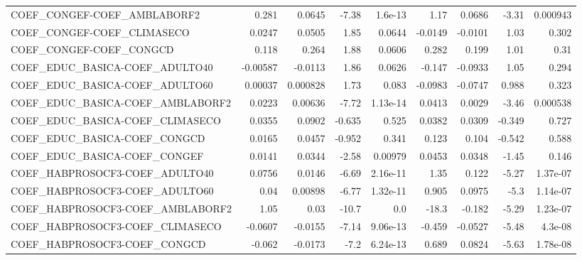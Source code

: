 \begin{tabular}{lrrrrrrrr}
COEF\_CONGEF-COEF\_AMBLABORF2            &       0.281 &       0.0645 &    -7.38 &  1.6e-13 &       1.17 &      0.0686 &        -3.31 &      0.000943 \\
COEF\_CONGEF-COEF\_CLIMASECO             &      0.0247 &       0.0505 &     1.85 &   0.0644 &    -0.0149 &     -0.0101 &         1.03 &         0.302 \\
COEF\_CONGEF-COEF\_CONGCD                &       0.118 &        0.264 &     1.88 &   0.0606 &      0.282 &       0.199 &         1.01 &          0.31 \\
COEF\_EDUC\_BASICA-COEF\_ADULTO40         &    -0.00587 &      -0.0113 &     1.86 &   0.0626 &     -0.147 &     -0.0933 &         1.05 &         0.294 \\
COEF\_EDUC\_BASICA-COEF\_ADULTO60         &     0.00037 &     0.000828 &     1.73 &    0.083 &    -0.0983 &     -0.0747 &        0.988 &         0.323 \\
COEF\_EDUC\_BASICA-COEF\_AMBLABORF2       &      0.0223 &      0.00636 &    -7.72 & 1.13e-14 &     0.0413 &      0.0029 &        -3.46 &      0.000538 \\
COEF\_EDUC\_BASICA-COEF\_CLIMASECO        &      0.0355 &       0.0902 &   -0.635 &    0.525 &     0.0382 &      0.0309 &       -0.349 &         0.727 \\
COEF\_EDUC\_BASICA-COEF\_CONGCD           &      0.0165 &       0.0457 &   -0.952 &    0.341 &      0.123 &       0.104 &       -0.542 &         0.588 \\
COEF\_EDUC\_BASICA-COEF\_CONGEF           &      0.0141 &       0.0344 &    -2.58 &  0.00979 &     0.0453 &      0.0348 &        -1.45 &         0.146 \\
COEF\_HABPROSOCF3-COEF\_ADULTO40         &      0.0756 &       0.0146 &    -6.69 & 2.16e-11 &       1.35 &       0.122 &        -5.27 &      1.37e-07 \\
COEF\_HABPROSOCF3-COEF\_ADULTO60         &        0.04 &      0.00898 &    -6.77 & 1.32e-11 &      0.905 &      0.0975 &         -5.3 &      1.14e-07 \\
COEF\_HABPROSOCF3-COEF\_AMBLABORF2       &        1.05 &         0.03 &    -10.7 &      0.0 &      -18.3 &      -0.182 &        -5.29 &      1.23e-07 \\
COEF\_HABPROSOCF3-COEF\_CLIMASECO        &     -0.0607 &      -0.0155 &    -7.14 & 9.06e-13 &     -0.459 &     -0.0527 &        -5.48 &       4.3e-08 \\
COEF\_HABPROSOCF3-COEF\_CONGCD           &      -0.062 &      -0.0173 &     -7.2 & 6.24e-13 &      0.689 &      0.0824 &        -5.63 &      1.78e-08 \\

\end{tabular}

